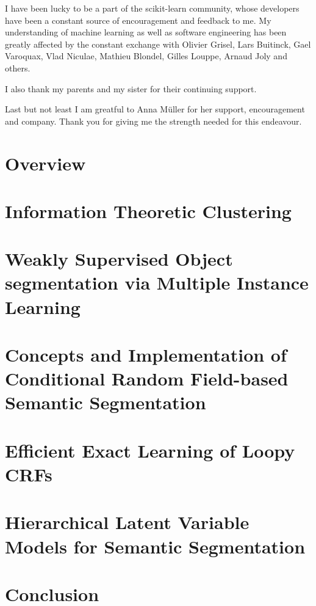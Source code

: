 \documentclass[12pt,toc=bibnumbered, a4paper,twoside]{scrbook}
\begin{document}
I have been lucky to be a part of the scikit-learn community, whose developers
have been a constant source of encouragement and feedback to me. My understanding
of machine learning as well as software engineering has been greatly affected
by the constant exchange with Olivier Grisel, Lars Buitinck, Gael Varoquax,
Vlad Niculae, Mathieu Blondel, Gilles Louppe, Arnaud Joly and others.

I also thank my parents and my sister for their continuing support.

Last but not least I am greatful to Anna M\"uller for her support,
encouragement and company. Thank you for giving me the strength needed for this
endeavour.


\chapter{Overview}


\chapter{Information Theoretic Clustering}


\chapter{Weakly Supervised Object segmentation via Multiple Instance Learning}



\chapter{Concepts and Implementation of Conditional Random Field-based Semantic Segmentation}\label{ch:structured_pystruct}



\chapter{Efficient Exact Learning of Loopy CRFs}



\chapter{Hierarchical Latent Variable Models for Semantic Segmentation}\label{ch:latent}

\chapter{Conclusion}




\end{document}
